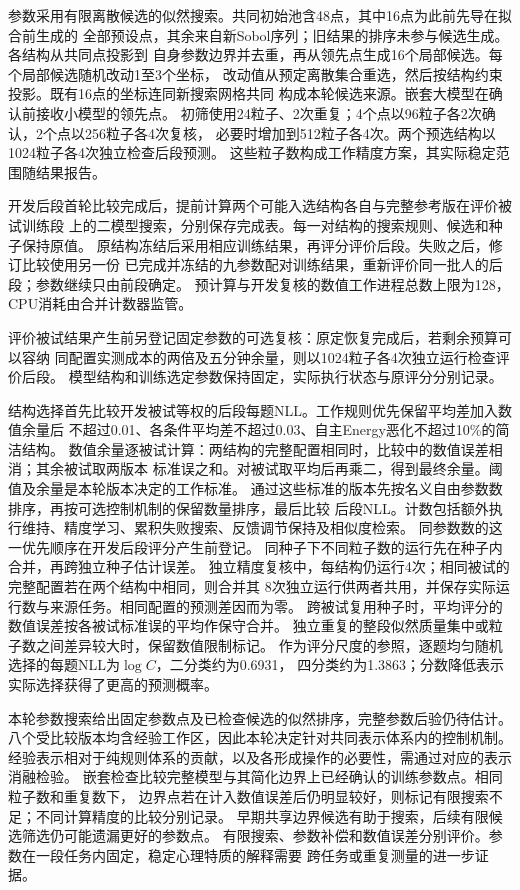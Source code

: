 \documentclass[11pt,a4paper]{article}
\numberwithin{equation}{section}
\begin{document}
参数采用有限离散候选的似然搜索。共同初始池含48点，其中16点为此前先导在拟合前生成的
全部预设点，其余来自新Sobol序列；旧结果的排序未参与候选生成。各结构从共同点投影到
自身参数边界并去重，再从领先点生成16个局部候选。每个局部候选随机改动1至3个坐标，
改动值从预定离散集合重选，然后按结构约束投影。既有16点的坐标连同新搜索网格共同
构成本轮候选来源。嵌套大模型在确认前接收小模型的领先点。
初筛使用24粒子、2次重复；4个点以96粒子各2次确认，2个点以256粒子各4次复核，
必要时增加到512粒子各4次。两个预选结构以1024粒子各4次独立检查后段预测。
这些粒子数构成工作精度方案，其实际稳定范围随结果报告。

开发后段首轮比较完成后，提前计算两个可能入选结构各自与完整参考版在评价被试训练段
上的二模型搜索，分别保存完成表。每一对结构的搜索规则、候选和种子保持原值。
原结构冻结后采用相应训练结果，再评分评价后段。失败之后，修订比较使用另一份
已完成并冻结的九参数配对训练结果，重新评价同一批人的后段；参数继续只由前段确定。
预计算与开发复核的数值工作进程总数上限为128，CPU消耗由合并计数器监管。

评价被试结果产生前另登记固定参数的可选复核：原定恢复完成后，若剩余预算可以容纳
同配置实测成本的两倍及五分钟余量，则以1024粒子各4次独立运行检查评价后段。
模型结构和训练选定参数保持固定，实际执行状态与原评分分别记录。

结构选择首先比较开发被试等权的后段每题NLL。工作规则优先保留平均差加入数值余量后
不超过0.01、各条件平均差不超过0.03、自主Energy恶化不超过10\%的简洁结构。
数值余量逐被试计算：两结构的完整配置相同时，比较中的数值误差相消；其余被试取两版本
标准误之和。对被试取平均后再乘二，得到最终余量。阈值及余量是本轮版本决定的工作标准。
通过这些标准的版本先按名义自由参数数排序，再按可选控制机制的保留数量排序，最后比较
后段NLL。计数包括额外执行维持、精度学习、累积失败搜索、反馈调节保持及相似度检索。
同参数数的这一优先顺序在开发后段评分产生前登记。
同种子下不同粒子数的运行先在种子内合并，再跨独立种子估计误差。
独立精度复核中，每结构仍运行4次；相同被试的完整配置若在两个结构中相同，则合并其
8次独立运行供两者共用，并保存实际运行数与来源任务。相同配置的预测差因而为零。
跨被试复用种子时，平均评分的数值误差按各被试标准误的平均作保守合并。
独立重复的整段似然质量集中或粒子数之间差异较大时，保留数值限制标记。
作为评分尺度的参照，逐题均匀随机选择的每题NLL为$\log C$，二分类约为0.6931，
四分类约为1.3863；分数降低表示实际选择获得了更高的预测概率。

本轮参数搜索给出固定参数点及已检查候选的似然排序，完整参数后验仍待估计。
八个受比较版本均含经验工作区，因此本轮决定针对共同表示体系内的控制机制。
经验表示相对于纯规则体系的贡献，以及各形成操作的必要性，需通过对应的表示消融检验。
嵌套检查比较完整模型与其简化边界上已经确认的训练参数点。相同粒子数和重复数下，
边界点若在计入数值误差后仍明显较好，则标记有限搜索不足；不同计算精度的比较分别记录。
早期共享边界候选有助于搜索，后续有限候选筛选仍可能遗漏更好的参数点。
有限搜索、参数补偿和数值误差分别评价。参数在一段任务内固定，稳定心理特质的解释需要
跨任务或重复测量的进一步证据。
\end{document}
